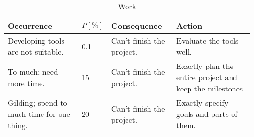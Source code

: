 \begin{longtable}{|X|p{1.2cm}|X|X|}
	\caption[]{\label{tab:riskListWork} Work}\\
    \hline
    \textbf{Occurrence} &
    \textbf{$P [\%]$} &
    \textbf{Consequence} &
    \textbf{Action} \\
    \hline
    \hline
	Developing tools are not suitable. &
	0.1 &
	Can't finish the project. &
	Evaluate the tools well. \\
	\hline
	To much; need more time. &
	15 &
	Can't finish the project. &
    Exactly plan the entire project and keep the milestones. \\
	\hline
	Gilding; spend to much time for one thing. &
	20 &
	Can't finish the project. &
	Exactly specify goals and parts of them. \\
	\hline
\end{longtable}
